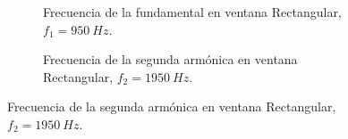       \begin{figure}[H]
        \centering
        \begin{subfigure}[H]{0.48\textwidth}
          \caption{Frecuencia de la fundamental en ventana Rectangular, $f_{1}=950~Hz$.}
        \end{subfigure}
        \hfill
        \begin{subfigure}[H]{0.48\textwidth}
          \caption{Frecuencia de la segunda armónica en ventana Rectangular, $f_{2}=1950~Hz$.}

\end{subfigure}
\end{figure}
